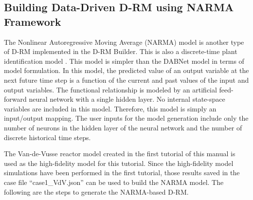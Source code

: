 \subsection{Building Data-Driven D-RM using NARMA Framework}
The Nonlinear Autoregressive Moving Average (NARMA) model is another type of D-RM implemented in the D-RM Builder.  This is also a discrete-time plant identification model \cite{Narendra_1997}.  This model is simpler than the DABNet model in terms of model formulation.  In this model, the predicted value of an output variable at the next future time step is a function of the current and past values of the input and output variables.  The functional relationship is modeled by an artificial feed-forward neural network with a single hidden layer.  No internal state-space variables are included in this model.  Therefore, this model is simply an input/output mapping.  The user inputs for the model generation include only the number of neurons in the hidden layer of the neural network and the number of discrete historical time steps.

The Van-de-Vusse reactor model created in the first tutorial of this manual is used as the 
high-fidelity model for this tutorial.  Since the high-fidelity model simulations have been performed in the first tutorial, those results saved in the case file ``case1\_VdV.json'' can be used to build the NARMA model.  The following are the steps to generate the NARMA-based D-RM.

